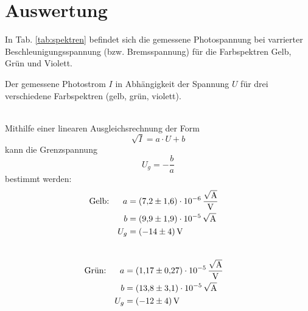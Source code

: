 \section{Auswertung}
\label{sec:Auswertung}
In Tab. \ref{tab:spektren} befindet sich die gemessene Photospannung bei varrierter Beschleunigungsspannung (bzw. Bremsspannung) für die Farbspektren Gelb, Grün und Violett.
\begin{table}
    \centering
    \caption{Der gemessene Photostrom $I$ in Abhängigkeit der Spannung $U$ für drei verschiedene Farbspektren (gelb, grün, violett).}
    \label{tab:spektren}  
\end{table}
\\
Mithilfe einer linearen Ausgleichsrechnung der Form
\begin{equation}
  \sqrt{I} = a \cdot U + b
  \label{eqn:ausgleichsgerade}
\end{equation}
kann die Grenzspannung
\begin{equation}
  U_g = -\frac{b}{a}
\end{equation}
bestimmt werden:
\\
\begin{align*}
  \text{Gelb:} && a &= \SI{7.2(16)e-06}{\frac{\sqrt{\ampere}}{\volt}} &\\
  && b &= \SI{9.9(19)e-05}{\sqrt{\ampere}} &\\
  && U_g &= \SI{-14(4)}{\volt}
\end{align*}
\\
\begin{align*}
  \text{Grün:} && a &= \SI{1.17(27)e-05}{\frac{\sqrt{\ampere}}{\volt}} &\\
  && b &= \SI{13.8(31)e-05}{\sqrt{\ampere}} &\\
  && U_g &= \SI{-12(4)}{\volt}
\end{align*}
